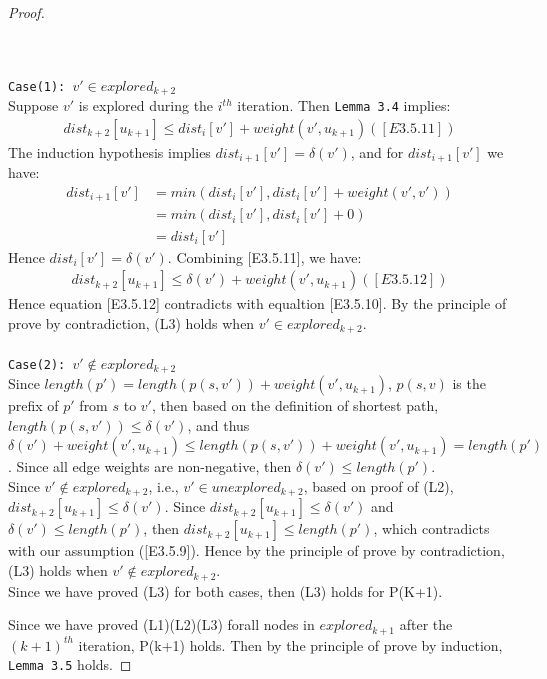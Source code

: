\documentclass[11pt, oneside]{article}   	%
\theoremstyle{definition}
\begin{document}
\begin{proof}
\begin{itemize}
\begin{enumerate}
  \\\\
  \texttt{Case(1): $v' \in explored_{k+2}$}
  \\
  Suppose $v'$ is explored during the $i^{th}$ iteration. Then \texttt{Lemma 3.4} implies: 
  \begin{align*}
    dist_{k+2}[u_{k+1}] \leq dist_i[v'] + weight(v', u_{k+1}) ([E3.5.11])
  \end{align*}
  The induction hypothesis implies $dist_{i+1}[v'] = \delta(v')$, and for $dist_{i+1}[v']$ we have: 
  \begin{align*}
    dist_{i+1}[v'] &= min(dist_i[v'], dist_i[v'] + weight(v', v')) \\
                   &= min(dist_i[v'], dist_i[v'] + 0) \\
                   &= dist_i[v']
  \end{align*}
  Hence $dist_i[v'] = \delta(v')$. Combining [E3.5.11], we have: 
  \begin{align*}
    dist_{k+2}[u_{k+1}] \leq \delta(v') + weight(v', u_{k+1}) ([E3.5.12])
  \end{align*}
  Hence equation [E3.5.12] contradicts with equaltion [E3.5.10]. By the principle of prove by contradiction, (L3) holds when $v' \in explored_{k+2}$. 
  \\\\
  \texttt{Case(2): $v' \notin explored_{k+2}$}
  \\
  Since $length(p') = length(p(s, v')) + weight(v', u_{k+1})$, $p(s, v)$ is the prefix of $p'$ from $s$ to $v'$, then based on the definition of shortest path, $length(p(s, v')) \leq \delta(v')$, and thus $\delta(v') + weight(v', u_{k+1}) \leq length(p(s, v')) + weight(v', u_{k+1}) = length(p')$. Since all edge weights are non-negative, then $\delta(v') \leq length(p')$.
  \\
  Since $v' \notin explored_{k+2}$, i.e., $v' \in unexplored_{k+2}$, based on proof of (L2), $dist_{k+2}[u_{k+1}] \leq \delta(v')$. Since $dist_{k+2}[u_{k+1}] \leq \delta(v')$ and $\delta(v') \leq length(p')$, then $dist_{k+2}[u_{k+1}] \leq length(p')$, which contradicts with our assumption ([E3.5.9]). Hence by the principle of prove by contradiction, (L3) holds when $v' \notin explored_{k+2}$. 
  \\
  Since we have proved (L3) for both cases, then (L3) holds for P(K+1). 
  \end{enumerate}
\end{itemize}
Since we have proved (L1)(L2)(L3) forall nodes in $explored_{k+1}$ after the $(k+1)^{th}$ iteration, P(k+1) holds. Then by the principle of prove by induction, \texttt{Lemma 3.5} holds. 
\end{proof}
\end{document}
